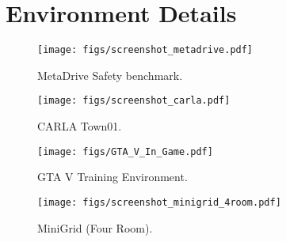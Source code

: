 
\section{Environment Details}
\label{section:environment-details}


\begin{figure}[H]
\begin{minipage}{0.45\linewidth}
\centering
\texttt{[image: figs/screenshot\_metadrive.pdf]}
\caption{
MetaDrive Safety benchmark.
}
\end{minipage}\hfill
\begin{minipage}{0.5\linewidth}
\centering
\texttt{[image: figs/screenshot\_carla.pdf]}
\caption{
CARLA Town01.
}
\end{minipage}
\end{figure}

\begin{figure}[H]
\begin{minipage}{0.6\linewidth}
\centering
\texttt{[image: figs/GTA\_V\_In\_Game.pdf]}
\caption{
GTA V Training Environment.
}
\end{minipage}
\hfill
\begin{minipage}{0.35\linewidth}
\centering
\texttt{[image: figs/screenshot\_minigrid\_4room.pdf]}
\caption{
MiniGrid (Four Room).
}
\end{minipage}
\end{figure}


